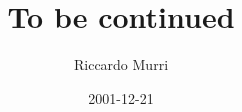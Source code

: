 \title{To be continued}
\date{2001-12-21}
\author{Riccardo Murri}
\address{%
  Scuola Normale Superiore \\
  p.za dei Cavalieri, 7 \\
  56127 Pisa \\
  Italy
  }

\maketitle

\setcounter{tocdepth}{2} %

\tableofcontents

